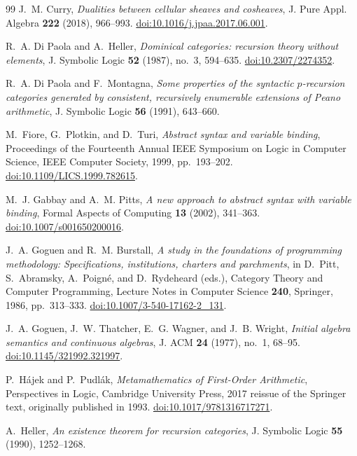 \begin{thebibliography}{99}
J.~M. Curry, \emph{Dualities between cellular sheaves and cosheaves},
J. Pure Appl. Algebra \textbf{222} (2018), 966--993.
\href{https://doi.org/10.1016/j.jpaa.2017.06.001}
{doi:10.1016/j.jpaa.2017.06.001}.

R.~A. Di Paola and A.~Heller, \emph{Dominical categories:
recursion theory without elements}, J. Symbolic Logic
\textbf{52} (1987), no.~3, 594--635.
\href{https://doi.org/10.2307/2274352}{doi:10.2307/2274352}.

R.~A. Di Paola and F.~Montagna, \emph{Some properties of the syntactic
$p$-recursion categories generated by consistent, recursively enumerable
extensions of Peano arithmetic}, J. Symbolic Logic \textbf{56} (1991),
643--660.

M.~Fiore, G.~Plotkin, and D.~Turi,
\emph{Abstract syntax and variable binding},
Proceedings of the Fourteenth Annual IEEE Symposium on Logic in
Computer Science, IEEE Computer Society, 1999, pp.~193--202.
\href{https://doi.org/10.1109/LICS.1999.782615}{doi:10.1109/LICS.1999.782615}.

M.~J. Gabbay and A.~M. Pitts,
\emph{A new approach to abstract syntax with variable binding},
Formal Aspects of Computing \textbf{13} (2002), 341--363.
\href{https://doi.org/10.1007/s001650200016}{doi:10.1007/s001650200016}.

J.~A. Goguen and R.~M. Burstall,
\emph{A study in the foundations of programming methodology:
Specifications, institutions, charters and parchments},
in D.~Pitt, S.~Abramsky, A.~Poign\'e, and D.~Rydeheard (eds.),
Category Theory and Computer Programming, Lecture Notes in Computer
Science \textbf{240}, Springer, 1986, pp.~313--333.
\href{https://doi.org/10.1007/3-540-17162-2_131}{doi:10.1007/3-540-17162-2\_131}.

J.~A. Goguen, J.~W. Thatcher, E.~G. Wagner, and J.~B. Wright,
\emph{Initial algebra semantics and continuous algebras},
J. ACM \textbf{24} (1977), no.~1, 68--95.
\href{https://doi.org/10.1145/321992.321997}{doi:10.1145/321992.321997}.

P.~H\'ajek and P.~Pudl\'ak, \emph{Metamathematics of First-Order
Arithmetic}, Perspectives in Logic, Cambridge \mbox{University} Press,
2017 reissue of the Springer text, originally published in 1993.
\href{https://doi.org/10.1017/9781316717271}{doi:10.1017/9781316717271}.

A.~Heller, \emph{An existence theorem for recursion categories},
J. Symbolic Logic \textbf{55} (1990), 1252--1268.


\end{thebibliography}
